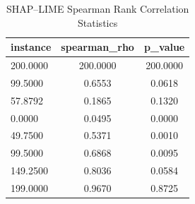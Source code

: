 \begin{table}
\centering
\caption{SHAP–LIME Spearman Rank Correlation Statistics}
\label{tab:agreement}
\begin{tabular}{lcc}
\toprule
instance & spearman_rho & p_value \\
\midrule
200.0000 & 200.0000 & 200.0000 \\
99.5000 & 0.6553 & 0.0618 \\
57.8792 & 0.1865 & 0.1320 \\
0.0000 & 0.0495 & 0.0000 \\
49.7500 & 0.5371 & 0.0010 \\
99.5000 & 0.6868 & 0.0095 \\
149.2500 & 0.8036 & 0.0584 \\
199.0000 & 0.9670 & 0.8725 \\
\bottomrule
\end{tabular}
\end{table}
